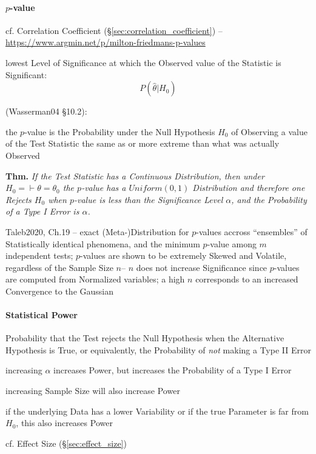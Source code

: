 \paragraph{$p$-value}\label{sec:p_value}\hfill

cf. Correlation Coefficient (\S\ref{sec:correlation_coefficient})
--\url{https://www.argmin.net/p/milton-friedmans-p-values}

lowest Level of Significance at which the Observed value of the Statistic is
Significant:
\[
  P(\hat{\theta} | H_0)
\]

(Wasserman04 \S10.2):

the $p$-value is the Probability under the Null Hypothesis $H_0$ of Observing a
value of the Test Statistic the same as or more extreme than what was actually
Observed

\textbf{Thm.} \emph{
  If the Test Statistic has a Continuous Distribution, then under
  $H_0 = \vdash \theta = \theta_0$ the $p$-value has a $Uniform(0,1)$
  Distribution and therefore one Rejects $H_0$ when $p$-value is less than the
  Significance Level $\alpha$, and the Probability of a Type I Error is
  $\alpha$.
}

Taleb2020, Ch.19 -- exact (Meta-)Distribution for $p$-values accross
``ensembles'' of Statistically identical phenomena, and the minimum $p$-value
among $m$ independent tests; $p$-values are shown to be extremely Skewed and
Volatile, regardless of the Sample Size $n$-- $n$ does not increase Significance
since $p$-values are computed from Normalized variables; a high $n$ corresponds
to an increased Convergence to the Gaussian



\paragraph{Statistical Power}\label{sec:statistical_power}\hfill

Probability that the Test rejects the Null Hypothesis when the Alternative
Hypothesis is True, or equivalently, the Probability of \emph{not} making a Type
II Error

increasing $\alpha$ increases Power, but increases the Probability of a Type I
Error

increasing Sample Size will also increase Power

if the underlying Data has a lower Variability or if the true Parameter is far
from $H_0$, this also increases Power

cf. Effect Size (\S\ref{sec:effect_size})



